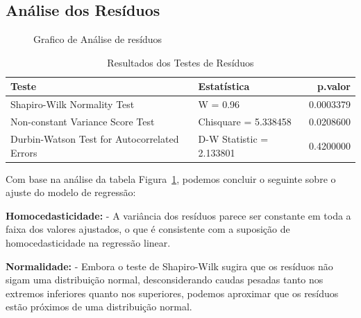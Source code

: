 \documentclass[
  letterpaper,
  DIV=11,
  numbers=noendperiod]{scrreprt}
\begin{document}
\subsection{Análise dos Resíduos}\label{anuxe1lise-dos-resuxedduos}

\begin{figure}

\caption{\label{fig-t3}Grafico de Análise de resíduos}


\end{figure}%

\begin{longtable}[t]{l>{\raggedright\arraybackslash}p{17em}r}
\caption{\label{tab:unnamed-chunk-16}Resultados dos Testes de Resíduos}\\
\toprule
Teste & Estatística & p.valor\\
\midrule
Shapiro-Wilk Normality Test & W = 0.96 & 0.0003379\\
Non-constant Variance Score Test & Chisquare = 5.338458 & 0.0208600\\
Durbin-Watson Test for Autocorrelated Errors & D-W Statistic = 2.133801 & 0.4200000\\
\bottomrule
\end{longtable}

Com base na análise da tabela Figura~\ref{fig-t3}, podemos concluir o
seguinte sobre o ajuste do modelo de regressão:

\textbf{Homocedasticidade:} - A variância dos resíduos parece ser
constante em toda a faixa dos valores ajustados, o que é consistente com
a suposição de homocedasticidade na regressão linear.

\textbf{Normalidade:} - Embora o teste de Shapiro-Wilk sugira que os
resíduos não sigam uma distribuição normal, desconsiderando caudas
pesadas tanto nos extremos inferiores quanto nos superiores, podemos
aproximar que os resíduos estão próximos de uma distribuição normal.
\end{document}
